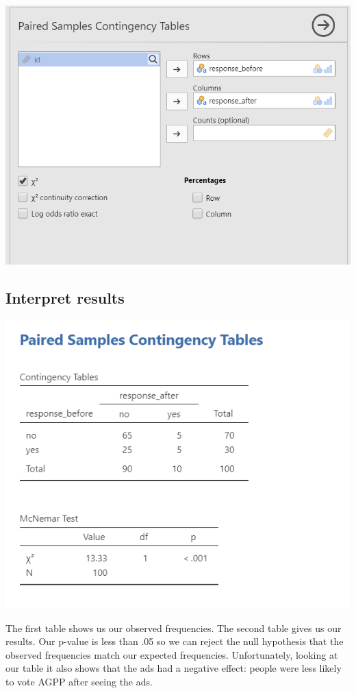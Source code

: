 \documentclass[
]{book}
\begin{document}
\includegraphics{images/12-mcnemar/mcnemar_setup.png}

\hypertarget{interpret-results-3}{%
\subsection{Interpret results}\label{interpret-results-3}}

\includegraphics{images/12-mcnemar/mcnemar_results.png}

The first table shows us our observed frequencies. The second table gives us our results. Our p-value is less than .05 so we can reject the null hypothesis that the observed frequencies match our expected frequencies. Unfortunately, looking at our table it also shows that the ads had a negative effect: people were less likely to vote AGPP after seeing the ads.
\end{document}
